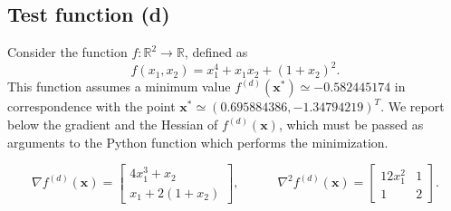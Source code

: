 \documentclass[a4paper,11pt]{article}
\begin{document}
	\subsection{Test function (d)}
	Consider the function $f:\mathbb{R}^{2} \rightarrow  \mathbb{R}$, defined as
	\begin{equation}
		f(x_{1},x_{2}) = x_{1}^{4} + x_{1}x_{2} + (1+x_{2})^{2}.
	\end{equation} This function assumes a minimum value $f^{(d)}(\textbf{x}^*)\simeq -0.582445174$ in correspondence with the point $\textbf{x}^{*}\simeq (0.695884386, -1.34794219)^{T}$. We report below the gradient and the Hessian of $f^{(d)}(\textbf{x})$, which must be passed as arguments to the Python function which performs the minimization.
	
	\begin{equation}
		\nabla f^{(d)}(\textbf{x}) = \begin{bmatrix}
			4x_{1}^{3} + x_{2} \\
			x_{1} +2(1+x_{2})
		\end{bmatrix}, \qquad \quad
		\nabla^2 f^{(d)}(\textbf{x}) = \begin{bmatrix}
		12x_{1}^{2} & 1 \\
		1 & 2
	\end{bmatrix}.
	\end{equation}
\end{document}
